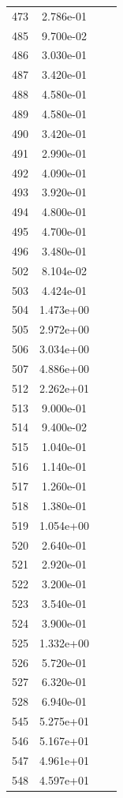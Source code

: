 \documentclass[12pt]{article}
\begin{document}
\begin{longtable}{@{}cccc@{}}
473 & 2.786e-01 &  &  \\
485 & 9.700e-02 &  &  \\
486 & 3.030e-01 &  &  \\
487 & 3.420e-01 &  &  \\
488 & 4.580e-01 &  &  \\
489 & 4.580e-01 &  &  \\
490 & 3.420e-01 &  &  \\
491 & 2.990e-01 &  &  \\
492 & 4.090e-01 &  &  \\
493 & 3.920e-01 &  &  \\
494 & 4.800e-01 &  &  \\
495 & 4.700e-01 &  &  \\
496 & 3.480e-01 &  &  \\
502 & 8.104e-02 &  &  \\
503 & 4.424e-01 &  &  \\
504 & 1.473e+00 &  &  \\
505 & 2.972e+00 &  &  \\
506 & 3.034e+00 &  &  \\
507 & 4.886e+00 &  &  \\
512 & 2.262e+01 &  &  \\
513 & 9.000e-01 &  &  \\
514 & 9.400e-02 &  &  \\
515 & 1.040e-01 &  &  \\
516 & 1.140e-01 &  &  \\
517 & 1.260e-01 &  &  \\
518 & 1.380e-01 &  &  \\
519 & 1.054e+00 &  &  \\
520 & 2.640e-01 &  &  \\
521 & 2.920e-01 &  &  \\
522 & 3.200e-01 &  &  \\
523 & 3.540e-01 &  &  \\
524 & 3.900e-01 &  &  \\
525 & 1.332e+00 &  &  \\
526 & 5.720e-01 &  &  \\
527 & 6.320e-01 &  &  \\
528 & 6.940e-01 &  &  \\
545 & 5.275e+01 &  &  \\
546 & 5.167e+01 &  &  \\
547 & 4.961e+01 &  &  \\
548 & 4.597e+01 &  &  \\

\end{longtable}
\end{document}
